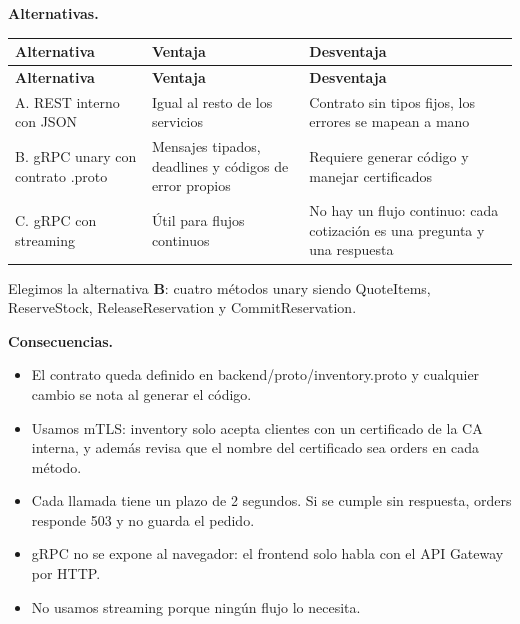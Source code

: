 \documentclass[10pt,letterpaper]{article}
\begin{document}
\textbf{Alternativas.}

{\footnotesize
\begin{longtable}{|P{\tabcolsep\relax}|P{\tabcolsep\relax}|P{\tabcolsep\relax}|}
\hline
\textbf{Alternativa} & \textbf{Ventaja} & \textbf{Desventaja} \\ \hline
\endfirsthead
\hline
\textbf{Alternativa} & \textbf{Ventaja} & \textbf{Desventaja} \\ \hline
\endhead
A. REST interno con JSON & Igual al resto de los servicios & Contrato sin tipos fijos, los errores se mapean a mano \\ \hline
B. gRPC unary con contrato .proto & Mensajes tipados, deadlines y códigos de error propios & Requiere generar código y manejar certificados \\ \hline
C. gRPC con streaming & Útil para flujos continuos & No hay un flujo continuo: cada cotización es una pregunta y una respuesta \\ \hline
\end{longtable}}
Elegimos la alternativa \textbf{B}: cuatro métodos unary siendo QuoteItems, ReserveStock, ReleaseReservation y CommitReservation.

\textbf{Consecuencias.}

\begin{itemize}
\item El contrato queda definido en backend/\allowbreak{}proto/\allowbreak{}inventory.\allowbreak{}proto y cualquier cambio se nota al generar el código.
\item Usamos mTLS: inventory solo acepta clientes con un certificado de la CA interna, y además revisa que el nombre del certificado sea orders en cada método.
\item Cada llamada tiene un plazo de 2 segundos. Si se cumple sin respuesta, orders responde 503 y no guarda el pedido.
\item gRPC no se expone al navegador: el frontend solo habla con el API Gateway por HTTP.
\item No usamos streaming porque ningún flujo lo necesita.
\end{itemize}
\end{document}
